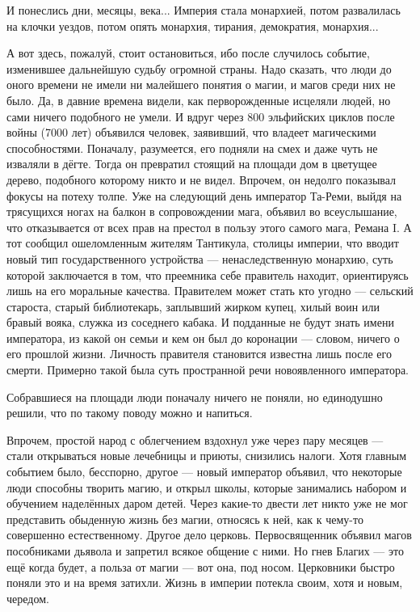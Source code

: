 \documentclass[12pt,a4paper]{book}
\begin{document}
И понеслись дни, месяцы, века... Империя стала монархией, потом развалилась на клочки уездов, потом опять монархия, тирания, демократия, монархия...

А вот здесь, пожалуй, стоит остановиться, ибо после случилось событие, изменившее дальнейшую судьбу огромной страны. Надо сказать, что люди до оного времени не имели ни малейшего понятия о магии, и магов среди них не было. Да, в давние времена видели, как перворожденные исцеляли людей, но сами ничего подобного не умели. И вдруг через 800 эльфийских циклов после войны (7000 лет) объявился человек, заявивший, что владеет магическими способностями. Поначалу, разумеется, его подняли на смех и даже чуть не изваляли в дёгте. Тогда он превратил стоящий на площади дом в цветущее дерево, подобного которому никто и не видел. Впрочем, он недолго показывал фокусы на потеху толпе. Уже на следующий день император Та-Реми, выйдя на трясущихся ногах на балкон в сопровождении мага, объявил во всеуслышание, что отказывается от всех прав на престол в пользу этого самого мага, Ремана I. А тот сообщил ошеломленным жителям Тантикула, столицы империи, что вводит новый тип государственного устройства --- ненаследственную монархию, суть которой заключается в том, что преемника себе правитель находит, ориентируясь лишь на его моральные качества. Правителем может стать кто угодно --- сельский староста, старый библиотекарь, заплывший жирком купец, хилый воин или бравый вояка, служка из соседнего кабака. И подданные не будут знать имени императора, из какой он семьи и кем он был до коронации --- словом, ничего о его прошлой жизни. Личность правителя становится известна лишь после его смерти. Примерно такой была суть пространной речи новоявленного императора.

Собравшиеся на площади люди поначалу ничего не поняли, но единодушно решили, что по такому поводу можно и напиться.

Впрочем, простой народ с облегчением вздохнул уже через пару месяцев --- стали открываться новые лечебницы и приюты, снизились налоги. Хотя главным событием было, бесспорно, другое --- новый император объявил, что некоторые люди способны творить магию, и открыл школы, которые занимались набором и обучением наделённых даром детей. Через какие-то двести лет никто уже не мог представить обыденную жизнь без магии, относясь к ней, как к чему-то совершенно естественному. Другое дело церковь. Первосвященник объявил магов пособниками дьявола и запретил всякое общение с ними. Но гнев Благих --- это ещё когда будет, а польза от магии --- вот она, под носом. Церковники быстро поняли это и на время затихли. Жизнь в империи потекла своим, хотя и новым, чередом.
\end{document}
